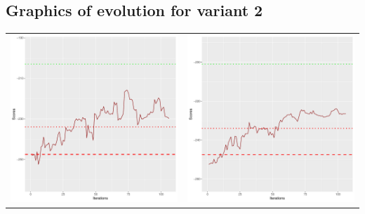 \documentclass[]{scrartcl}
\begin{document}
\clearpage

\subsection{Graphics of evolution for variant 2}

\begin{table}[h!]
\begin{tabular}{cc}
\includegraphics[scale = 0.4]{./figs/asia/v2/10/boundsEvolution-107.pdf} & 
\includegraphics[scale = 0.4]{./figs/asia/v2/20/boundsEvolution-107.pdf} \\

\end{tabular}
\end{table}
\end{document}
